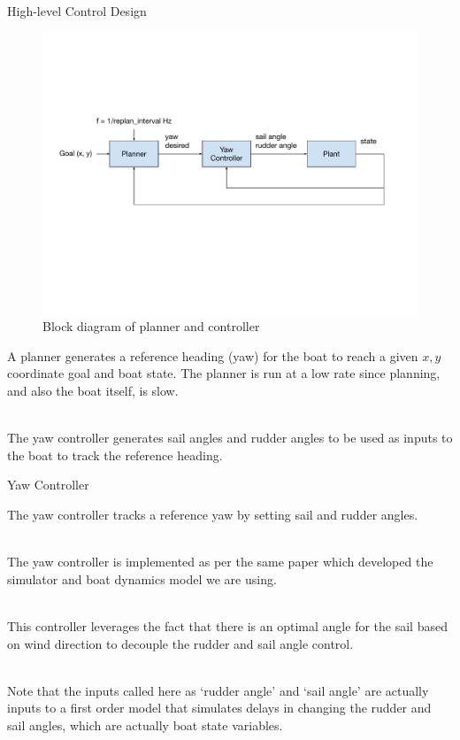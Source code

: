 \documentclass[10pt,xcolor={table,dvipsnames},t]{beamer}
\begin{document}
\begin{frame}{High-level Control Design}

\begin{figure}
    \centering
    \includegraphics[width=\linewidth,trim={1cm 7cm 2cm 5cm},clip]{documents/final_pres_figs/controller_block_diagram.pdf}
    \caption{Block diagram of planner and controller}
    \label{fig:controller_block_diagram}
\end{figure}
    
A planner generates a reference heading (yaw) for the boat to reach a given \(x, y\) coordinate goal
and boat state.
The planner is run at a low rate since planning, and also the boat itself, is slow.

\hfill\\
The yaw controller generates sail angles and rudder angles to be used as inputs to the boat to
track the reference heading.

\end{frame}

\begin{frame}{Yaw Controller}

    The yaw controller tracks a reference yaw by setting sail and rudder angles.

    \hfill\\
    The yaw controller is implemented as per the same paper which developed the simulator and 
    boat dynamics model we are using\cite{Buehler2018}.
    
    \hfill\\
    This controller leverages the fact that there is an optimal angle for the sail based on wind direction to decouple the rudder and sail angle control.
    
    \hfill\\
    Note that the inputs called here as `rudder angle' and `sail angle' are actually
    inputs to a first order model that simulates delays in changing the rudder and sail angles,
    which are actually boat state variables.
    
    \hfill\\
    
    
\end{frame}
\end{document}
